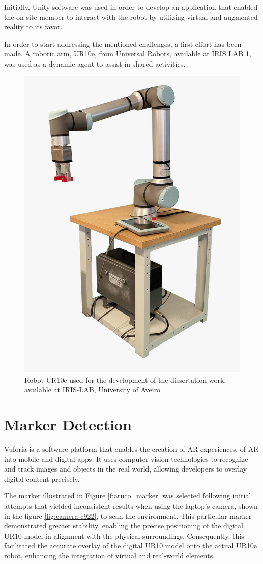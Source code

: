 Initially, Unity software was used in order to develop an application that enabled the on-site member to interact with the robot by utilizing 
virtual and augmented reality to its favor.  


In order to start addressing the mentioned challenges, a first effort has been made. A robotic arm, UR10e, from Universal Robots, 
available at IRIS LAB \ref{f:ur10e_iris}, was used as a dynamic agent to assist in shared activities.

\begin{figure}[h]
    \centering
    \includegraphics[width=0.4\linewidth]{figs/ur10e.jpeg}
    \caption{Robot UR10e used for the development of the dissertation work, available at IRIS-LAB, University of Aveiro}
    \label{f:ur10e_iris}
\end{figure}

\section{Marker Detection}
\label{section:marker-detection}


    Vuforia is a software platform that enables the creation of \ac{AR} experiences. 
    of AR into mobile and digital apps. 
    It uses computer vision technologies to recognize and track images and objects in the real world, allowing developers to overlay digital 
    content precisely.

    The marker illustrated in Figure \ref{f:aruco_marker} was selected following initial attempts that yielded inconsistent results when using 
    the laptop's camera, shown in the figure \ref{fig:camera-c922}, to scan the environment. This particular marker demonstrated greater stability, 
    enabling the precise positioning of the digital UR10 model in alignment with the physical surroundings. Consequently, this facilitated the accurate 
    overlay of the digital UR10 model onto the actual UR10e robot, enhancing the integration of virtual and real-world elements.

